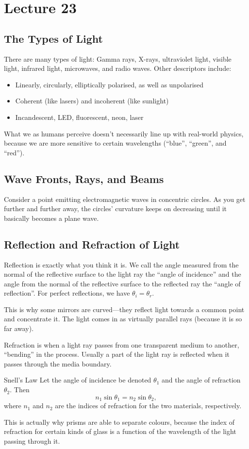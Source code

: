 \documentclass[class=article, crop=false]{standalone}
\begin{document}
  \section{Lecture 23}
  \subsection{The Types of Light}
  There are many types of light: Gamma rays, X-rays, ultraviolet light, visible light, infrared light, microwaves, and radio waves. Other descriptors include:
  \begin{itemize}
    \item Linearly, circularly, elliptically polarised, as well as unpolarised
    \item Coherent (like lasers) and incoherent (like sunlight)
    \item Incandescent, LED, fluorescent, neon, laser
  \end{itemize}
  \begin{note}{}
    What we as humans perceive doesn't necessarily line up with real-world physics, because we are more sensitive to certain wavelengths (``blue'', ``green'', and ``red'').
  \end{note}
  \subsection{Wave Fronts, Rays, and Beams}
  Consider a point emitting electromagnetic waves in concentric circles. As you get further and further away, the circles' curvature keeps on decreasing until it basically becomes a plane wave.
  \subsection{Reflection and Refraction of Light}
  Reflection is exactly what you think it is. We call the angle measured from the normal of the reflective surface to the light ray the ``angle of incidence'' and the angle from the normal of the reflective surface to the reflected ray the ``angle of reflection''. For perfect reflections, we have $\theta_i = \theta_r$.
  \begin{note}{}
    This is why some mirrors are curved---they reflect light towards a common point and concentrate it. The light comes in as virtually parallel rays (because it is so far away).
  \end{note}
  Refraction is when a light ray passes from one transparent medium to another, ``bending'' in the process. Usually a part of the light ray is reflected when it passes through the media boundary. 
  \begin{theorem}{Snell's Law}
    Let the angle of incidence be denoted $\theta_1$ and the angle of refraction $\theta_2$. Then
    \[
      n_1\sin\theta_1 = n_2\sin\theta_2,
    \]
    where $n_1$ and $n_2$ are the indices of refraction for the two materials, respectively.
  \end{theorem}
  \begin{note}{}
    This is actually why prisms are able to separate colours, because the index of refraction for certain kinds of glass is a function of the wavelength of the light passing through it.
  \end{note}
\end{document}

